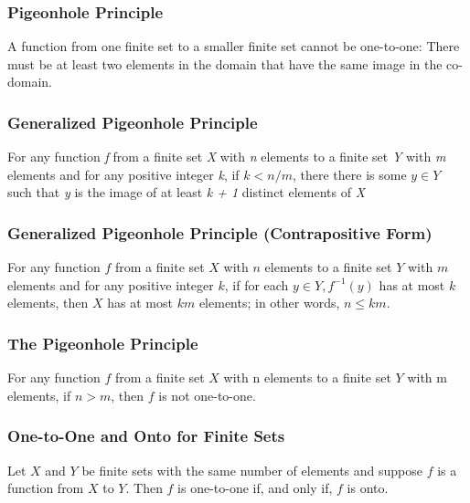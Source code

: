 \documentclass{article}
\begin{document}
\subsubsection*{Pigeonhole Principle}
A function from one finite set to a smaller finite set cannot be one-to-one: There must be at least two elements in the domain that have the same image in the co-domain.

\subsubsection*{Generalized Pigeonhole Principle}
For any function \textit{f} from a finite set \textit{X} with \textit{n} elements to a finite set \textit{Y} with \textit{m} elements and for any positive integer \textit{k}, if $ k < n/m $, there there is some $y \in Y$ such that \textit{y} is the image of at least \textit{k + 1} distinct elements of \textit{X}

\subsubsection{Generalized Pigeonhole Principle (Contrapositive Form)}
For any function $f$ from a finite set $X$ with $n$ elements to a finite set $Y$ with $m$ elements and for any positive integer $k$, if for each $y \in Y, f ^{−1} (y)$ has at most $k$ elements, then $X$ has at most $km$ elements; in other words, $n \leq km$.

\subsubsection{The Pigeonhole Principle}
For any function $f$ from a finite set $X$ with n elements to a finite set $Y$ with m elements, if $n > m$, then $f$ is not one-to-one.

\subsubsection{One-to-One and Onto for Finite Sets}
Let $X$ and $Y$ be finite sets with the same number of elements and suppose $f$ is a function from $X$ to $Y$. Then $f$ is one-to-one if, and only if, $f$ is onto.
\end{document}
